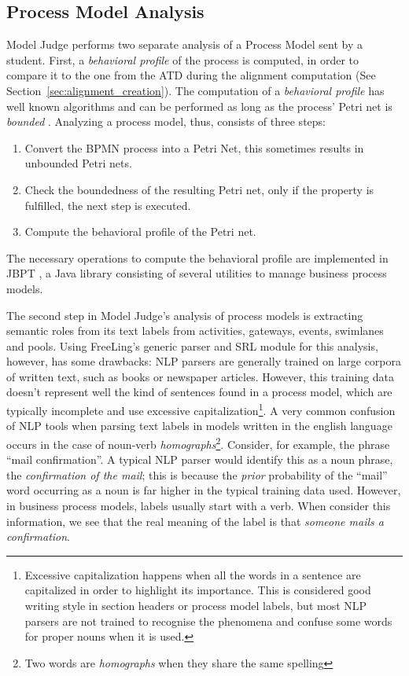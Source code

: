 \subsection{Process Model Analysis}
\label{sec:process_model_analysis}

Model Judge performs two separate analysis of a Process Model sent by a
student. First, a \emph{behavioral profile} of the process is computed, in order
to compare it to the one from the ATD during the alignment computation (See
Section~\ref{sec:alignment_creation}). The computation of a \emph{behavioral
  profile} has well known algorithms and can be performed as long as the
process' Petri net is \emph{bounded} \cite[Section IV.B]{murata1989petri}.
Analyzing a process model, thus, consists of three steps:
\begin{enumerate}
  \item Convert the BPMN process into a Petri Net, this sometimes results in
    unbounded Petri nets.
  \item Check the boundedness of the resulting Petri net, only if the
    property is fulfilled, the next step is executed.
  \item Compute the behavioral profile of the Petri net.  
\end{enumerate}

The necessary operations to compute the behavioral profile are implemented in
JBPT \cite{polyvyanyy2013towards}, a Java library consisting of several utilities
to manage business process models.

The second step in Model Judge's analysis of process models is extracting
semantic roles from its text labels from activities, gateways, events, swimlanes
and pools. Using FreeLing's generic parser and SRL module for this analysis,
however, has some drawbacks: NLP parsers are generally trained on large corpora
of written text, such as books or newspaper articles. However, this training
data doesn't represent well the kind of sentences found in a process model,
which are typically incomplete and use excessive
capitalization\footnote{Excessive capitalization happens when all the words in a
sentence are capitalized in order to highlight its importance. This is
considered good writing style in section headers or process model labels, but
most NLP parsers are not trained to recognise the phenomena and confuse some
words for proper nouns when it is used.}. A very common confusion of NLP tools 
when parsing text labels in models written in the english language occurs in the
case of noun-verb \emph{homographs}\footnote{Two words are \emph{homographs}
  when they share the same spelling}. Consider, for example, the phrase ``mail
confirmation''. A typical NLP parser would identify this as a noun phrase, the
\emph{confirmation of the mail}; this is because the \emph{prior} probability of
the ``mail'' word occurring as a noun is far higher in the typical training data
used. However, in business process models, labels usually start with a verb.
When consider this information, we see that the real meaning of the label is
that \emph{someone mails a confirmation}.

